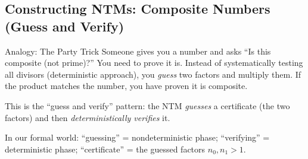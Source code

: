 \documentclass[11pt,a4paper]{article}
\begin{document}
\subsection{Constructing NTMs: Composite Numbers (Guess and Verify)}

\begin{notebox}{Analogy: The Party Trick}
Someone gives you a number and asks ``Is this composite (not prime)?'' You need to prove it is. Instead of systematically testing all divisors (deterministic approach), you \textit{guess} two factors and multiply them. If the product matches the number, you have proven it is composite.

This is the ``guess and verify'' pattern: the NTM \textit{guesses} a certificate (the two factors) and then \textit{deterministically verifies} it.

In our formal world: ``guessing'' = nondeterministic phase; ``verifying'' = deterministic phase; ``certificate'' = the guessed factors $n_0, n_1 > 1$.
\end{notebox}
\end{document}
